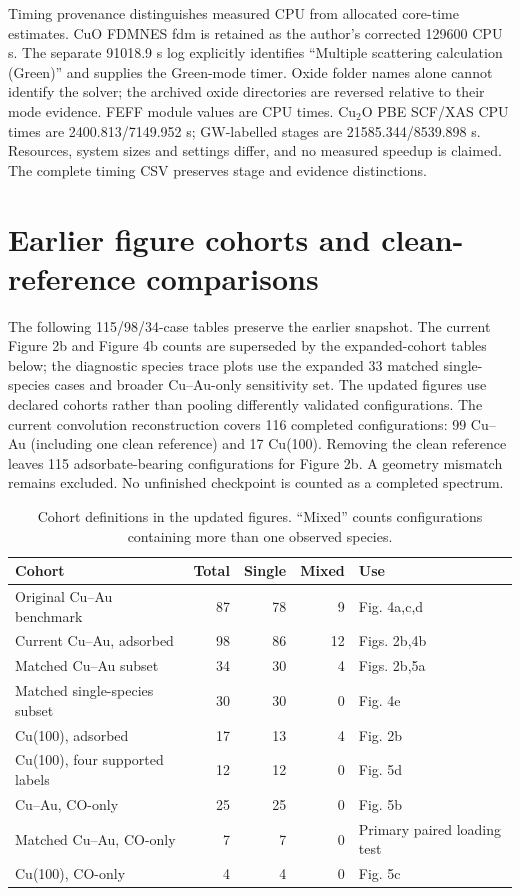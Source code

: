 \documentclass[11pt,a4paper]{article}
\begin{document}
Timing provenance distinguishes measured CPU from allocated core-time estimates. CuO FDMNES fdm is retained as the author's corrected 129600 CPU s. The separate 91018.9 s log explicitly identifies ``Multiple scattering calculation (Green)'' and supplies the Green-mode timer. Oxide folder names alone cannot identify the solver; the archived oxide directories are reversed relative to their mode evidence. FEFF module values are CPU times. Cu$_2$O PBE SCF/XAS CPU times are 2400.813/7149.952 s; GW-labelled stages are 21585.344/8539.898 s. Resources, system sizes and settings differ, and no measured speedup is claimed. The complete timing CSV preserves stage and evidence distinctions.

\section{Earlier figure cohorts and clean-reference comparisons}
\noindent The following 115/98/34-case tables preserve the earlier snapshot. The current Figure 2b and Figure 4b counts are superseded by the expanded-cohort tables below; the diagnostic species trace plots use the expanded 33 matched single-species cases and broader Cu--Au-only sensitivity set.
The updated figures use declared cohorts rather than pooling differently validated configurations. The current convolution reconstruction covers 116 completed configurations: 99 Cu--Au (including one clean reference) and 17 Cu(100). Removing the clean reference leaves 115 adsorbate-bearing configurations for Figure 2b. A geometry mismatch remains excluded. No unfinished checkpoint is counted as a completed spectrum.

\begin{table}[!htbp]\centering\small
\caption{Cohort definitions in the updated figures. ``Mixed'' counts configurations containing more than one observed species.}\label{tab:currentfigures}
\begin{tabular}{@{}lrrrl@{}}\toprule
Cohort & Total & Single & Mixed & Use\\\midrule
Original Cu--Au benchmark &87&78&9&Fig. 4a,c,d\\
Current Cu--Au, adsorbed &98&86&12&Figs. 2b,4b\\
Matched Cu--Au subset &34&30&4&Figs. 2b,5a\\
Matched single-species subset &30&30&0&Fig. 4e\\
Cu(100), adsorbed &17&13&4&Fig. 2b\\
Cu(100), four supported labels &12&12&0&Fig. 5d\\
Cu--Au, CO-only &25&25&0&Fig. 5b\\
Matched Cu--Au, CO-only &7&7&0&Primary paired loading test\\
Cu(100), CO-only &4&4&0&Fig. 5c\\\bottomrule
\end{tabular}\end{table}
\end{document}
